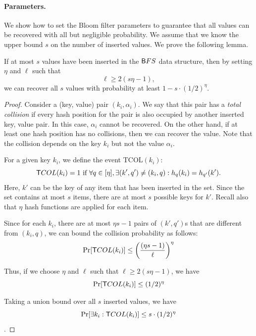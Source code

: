 
\paragraph{Parameters.}
%
We show how to set the Bloom filter parameters to guarantee that all
values can be recovered with all but negligible probability.  We assume
that we know the upper bound $s$ on the number of inserted values. We
prove the following lemma.

\begin{lemma}\label{lem:countingBloom}
If at most $s$ values have been inserted in the $\sf BFS$ data
structure, then by setting $\eta$ and $\ell$ such that $$\ell \ge 2 (s\eta - 1),$$
we can recover all $s$ values with probability at least
$1 - s\cdot(1/2)^\eta$.
\end{lemma} 


\begin{proof}
Consider a (key, value) pair $(k_i,\alpha_i)$.  We say that this pair
has a {\em total collision} if every hash position for the pair is also
occupied by another inserted key, value pair.  In this case, $\alpha_i$
cannot be recovered. On the other hand, if at least one hash position
has no collisions, then we can recover the value. Note that the
collision depends on the key $k_i$ but not the value $\alpha_i$. 

For a given key $k_i$, we define the event \textsf{TCOL}$(k_i)$: $${\sf
TCOL}(k_i) = 1 \textrm{ if } \forall q \in [\eta], \exists (k', q')
\ne (k_i,q): h_q(k_i) = h_{q'}(k').$$
Here, $k'$ can be the key of any item that has been inserted in the
set. Since the set contains at most $s$ items, there are at most $s$
possible keys for $k'$. Recall also that $\eta$ hash functions are applied
for each item. 

Since for each $k_i$, there are at most $\eta s - 1$ pairs of $(k',
q')$s that are different from $(k_i,q)$, we can bound the collision
probability as follows:
%
\[ \Pr[{\sf TCOL}(k_i) ] \le \left(\frac{(\eta s-1)}{\ell}\right)^\eta \]

Thus, if we choose $\eta$ and $\ell$ such that $\ell \ge 2 (s\eta - 1)$,
we have
\[ \Pr[{\sf TCOL}(k_i) ] \le (1/2)^\eta\]

Taking a union bound over all $s$ inserted values, we have
\[\Pr[ \exists k_i : {\sf TCOL}(k_i) ] \le s \cdot (1/2)^\eta\].
\end{proof}

